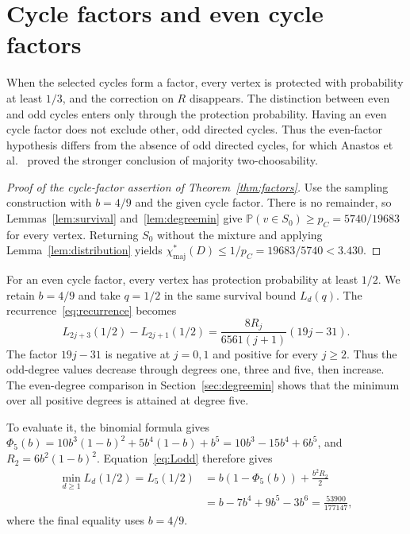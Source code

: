 \documentclass[12pt]{article}
\newcommand{\Pp}{\mathbb P}
\newcommand{\chif}{\chi^*_{\mathrm{maj}}}
\begin{document}
\section{Cycle factors and even cycle factors}\label{sec:factors}
When the selected cycles form a factor, every vertex is protected with probability at least \(1/3\), and the correction on \(R\) disappears. The distinction between even and odd cycles enters only through the protection probability. Having an even cycle factor does not exclude other, odd directed cycles. Thus the even-factor hypothesis differs from the absence of odd directed cycles, for which Anastos et al.~\cite{ALSS} proved the stronger conclusion of majority two-choosability.

\begin{proof}[Proof of the cycle-factor assertion of Theorem~\ref{thm:factors}]
Use the sampling construction with \(b=4/9\) and the given cycle factor. There is no remainder, so Lemmas~\ref{lem:survival} and~\ref{lem:degreemin} give \(\Pp(v\in S_0)\ge p_C=5740/19683\) for every vertex. Returning \(S_0\) without the mixture and applying Lemma~\ref{lem:distribution} yields \(\chif(D)\le1/p_C=19683/5740<3.430\).
\end{proof}

For an even cycle factor, every vertex has protection probability at least \(1/2\). We retain \(b=4/9\) and take \(q=1/2\) in the same survival bound \(L_d(q)\). The recurrence~\eqref{eq:recurrence} becomes
\begin{equation}\label{eq:evenrecurrence}
L_{2j+3}(1/2)-L_{2j+1}(1/2)
=\frac{8R_j}{6561(j+1)}(19j-31).
\end{equation}
The factor \(19j-31\) is negative at \(j=0,1\) and positive for every \(j\ge2\). Thus the odd-degree values decrease through degrees one, three and five, then increase. The even-degree comparison in Section~\ref{sec:degreemin} shows that the minimum over all positive degrees is attained at degree five.

To evaluate it, the binomial formula gives \(\Phi_5(b)=10b^3(1-b)^2+5b^4(1-b)+b^5=10b^3-15b^4+6b^5\), and \(R_2=6b^2(1-b)^2\). Equation~\eqref{eq:Lodd} therefore gives
\begin{equation}\label{eq:evenminimum}
\begin{aligned}
\min_{d\ge1}L_d(1/2)=L_5(1/2)
&=b(1-\Phi_5(b))+\frac{b^2R_2}{2}\\
&=b-7b^4+9b^5-3b^6=\frac{53900}{177147},
\end{aligned}
\end{equation}
where the final equality uses \(b=4/9\).
\end{document}
